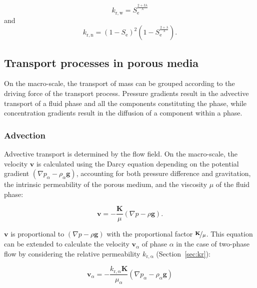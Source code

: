 \begin{equation}\label{eq:krw}
k_\mathrm{r,w} = S_\mathrm{e}^{\frac{2+3\lambda}{\lambda}}
\end{equation}
and  
\begin{equation}\label{eq:krn}
k_\mathrm{r,n} = \left( 1- S_\mathrm{e}\right)^2 \left( 1- S_\mathrm{e}^{\frac{2+\lambda}{\lambda}}\right).
\end{equation}

\subsection[Transport processes in porous media]{Transport processes in porous media }\label{sec:tipm}
On the macro-scale, the transport of mass can be grouped according to the driving force of the 
transport process. Pressure gradients result in the advective transport of a fluid phase
and all the components constituting the phase, 
while concentration gradients result in the diffusion of a component within a phase. 

\subsubsection{Advection}\label{sec:Advection}
Advective transport is determined by the flow field. 
On the macro-scale, the velocity $\mathbf{v}$ is calculated using the Darcy equation
depending on the potential gradient $(\nabla p_\alpha - \rho_\alpha \mathbf{g})$, 
accounting for both pressure difference and gravitation, 
the intrinsic permeability of the porous medium, 
and the viscosity $\mu$ of the fluid phase:

\begin{equation} \label{eq:Darcy1p}
\mathbf{v}=-\frac{\mathbf{K}}{\mu}(\nabla p - \rho \mathbf{g}).
\end{equation}

$\mathbf{v}$ is proportional to $(\nabla p - \rho \mathbf{g})$ with the proportional factor $\nicefrac{\mathbf{K}}{\mu}$.
This equation can be extended to calculate the velocity $\mathbf{v}_{\alpha}$ of phase $\alpha$ in the case of
two-phase flow by considering the relative permeability $k_\mathrm{r,\alpha}$ (Section~\ref{sec:kr}):

\begin{equation} \label{eq:Darcy2p}
\mathbf{v}_{\alpha}=-\frac{k_\mathrm{r,\alpha}\mathbf{K}}{\mu_{\alpha}}(\nabla p_{\alpha} - \rho_{\alpha} \mathbf{g})
\end{equation}

